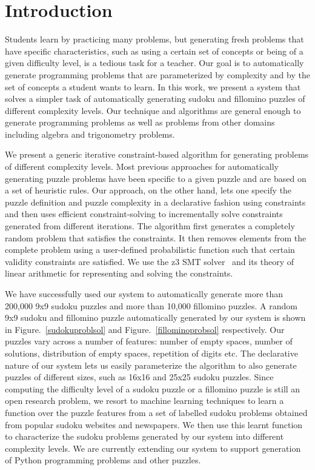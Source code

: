 \section{Introduction}

Students learn by practicing many problems, but generating fresh
problems that have specific characteristics, such as using a certain
set of concepts or being of a given difficulty level, is a tedious
task for a teacher. Our goal is to automatically generate programming
problems that are parameterized by complexity and by the set of
concepts a student wants to learn. In this work, we present a system
that solves a simpler task of automatically generating sudoku and
fillomino puzzles of different complexity levels. Our technique and
algorithms are general enough to generate programming problems as well
as problems from other domains including algebra and trigonometry
problems.

We present a generic iterative constraint-based algorithm for
generating problems of different complexity levels. Most previous
approaches for automatically generating puzzle problems have been
specific to a given puzzle and are based on a set of heuristic
rules. Our approach, on the other hand, lets one specify the puzzle
definition and puzzle complexity in a declarative fashion using
constraints and then uses efficient constraint-solving to
incrementally solve constraints generated from different
iterations. The algorithm first generates a completely random problem
that satisfies the constraints. It then removes elements from the
complete problem using a user-defined probabilistic function such that
certain validity constraints are satisfied. We use the z3 SMT
solver~\cite{z3} and its theory of linear arithmetic for representing
and solving the constraints.

We have successfully used our system to automatically generate more
than 200,000 9x9 sudoku puzzles and more than 10,000 fillomino
puzzles. A random 9x9 sudoku and fillomino puzzle automatically
generated by our system is shown in Figure.~\ref{sudokuproblsol} and
Figure.~\ref{fillominoprobsol} respectively. Our puzzles vary across a
number of features: number of empty spaces, number of solutions,
distribution of empty spaces, repetition of digits etc. The
declarative nature of our system lets us easily parameterize the
algorithm to also generate puzzles of different sizes, such as 16x16
and 25x25 sudoku puzzles. Since computing the difficulty level of a
sudoku puzzle or a fillomino puzzle is still an open research problem,
we resort to machine learning techniques to learn a function over the
puzzle features from a set of labelled sudoku problems obtained from
popular sudoku websites and newspapers. We then use this learnt
function to characterize the sudoku problems generated by our system
into different complexity levels. We are currently extending our
system to support generation of Python programming problems and other
puzzles.

